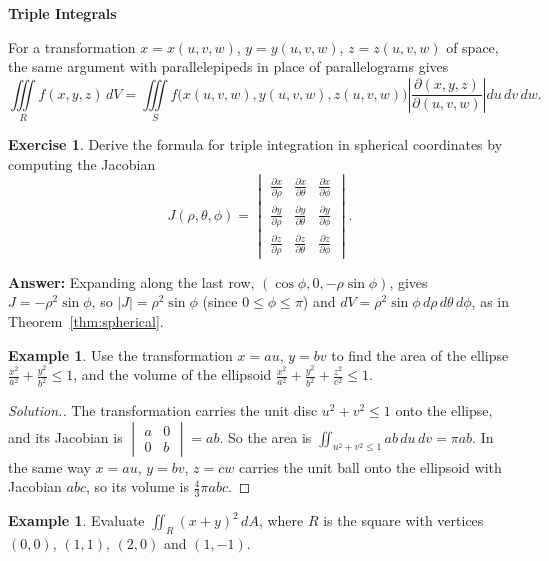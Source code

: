 \documentclass[11pt,a4paper]{article}
\theoremstyle{definition}
\newtheorem{exa}[thm]{Example}
\newtheorem{exe}[thm]{Exercise}
\newenvironment{solution}
  {\renewcommand{\qedsymbol}{}\begin{proof}[\textit{Solution}.]}
  {\end{proof}}
\newcommand{\subhead}[1]{%
  \par\medskip\noindent\textbf{#1}\par\nobreak\smallskip}
\begin{document}
\subhead{Triple Integrals}

For a transformation $x = x(u,v,w)$, $y = y(u,v,w)$, $z = z(u,v,w)$ of space,
the same argument with parallelepipeds in place of parallelograms gives
\[\iiint\limits_R f(x,y,z)\,dV = \iiint\limits_S f\big(x(u,v,w), y(u,v,w),
z(u,v,w)\big)\left|\frac{\partial(x,y,z)}{\partial(u,v,w)}\right|du\,dv\,dw .\]

\begin{exe}
\label{exe:sphericaljacobian}
Derive the formula for triple integration in spherical coordinates by computing
the Jacobian
\[J(\rho, \theta, \phi)=\begin{vmatrix}
\frac{\partial x}{\partial \rho} & \frac{\partial x}{\partial \theta} &
\frac{\partial x}{\partial \phi}\\[1ex]
\frac{\partial y}{\partial \rho} & \frac{\partial y}{\partial \theta} &
\frac{\partial y}{\partial \phi}\\[1ex]
\frac{\partial z}{\partial \rho} & \frac{\partial z}{\partial \theta} &
\frac{\partial z}{\partial \phi}
\end{vmatrix} .\]

\textbf{Answer:} Expanding along the last row, $(\cos\phi, 0, -\rho\sin\phi)$,
gives $J = -\rho^2\sin\phi$, so $|J| = \rho^2\sin\phi$ (since
$0\leq\phi\leq\pi$) and
$dV = \rho^2\sin\phi\,d\rho\,d\theta\,d\phi$, as in
Theorem~\ref{thm:spherical}.
\end{exe}

\begin{exa}
\label{ex:ellipsearea}
Use the transformation $x = au$, $y = bv$ to find the area of the ellipse
$\frac{x^2}{a^2} + \frac{y^2}{b^2}\leq 1$, and the volume of the ellipsoid
$\frac{x^2}{a^2} + \frac{y^2}{b^2} + \frac{z^2}{c^2}\leq 1$.
\end{exa}

\begin{solution}
The transformation carries the unit disc $u^2 + v^2\leq 1$ onto the ellipse, and
its Jacobian is $\begin{vmatrix} a & 0\\ 0 & b\end{vmatrix} = ab$. So the area is
$\iint_{u^2+v^2\leq 1}ab\,du\,dv = \pi ab$. In the same way $x = au$, $y = bv$,
$z = cw$ carries the unit ball onto the ellipsoid with Jacobian $abc$, so its
volume is $\frac43\pi abc$.
\end{solution}

\begin{exa}
\label{ex:changelinear}
Evaluate $\iint_R (x + y)^2\,dA$, where $R$ is the square with vertices $(0,0)$,
$(1,1)$, $(2,0)$ and $(1,-1)$.
\end{exa}
\end{document}

